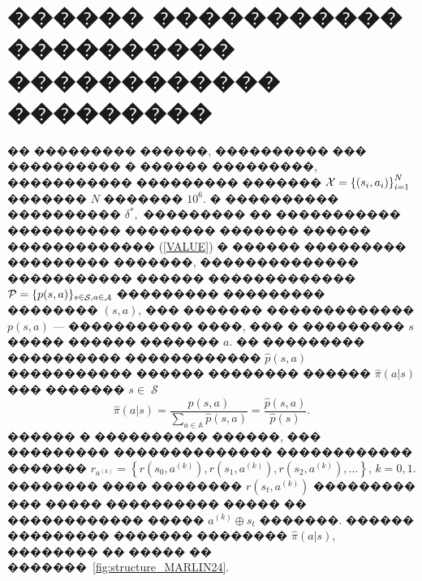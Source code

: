 \documentclass[11pt]{ubs}
\DeclareMathOperator{\perprob}{P}
\DeclareMathOperator{\state}{\mathcal{S}}
\DeclareMathOperator{\action}{\mathcal{A}}
\begin{document}
\newpage

\section{������ ����������� ���������� ������������ \\���������}
\label{par:MARLIN24_comp}





�� ��������� ������, ���������� ���  ���������� � ������ ���������, �����������
��������� �������  ${\cal X}=\left\{(s_i, a_i)\right\}_{i=1}^N$
������� $N$ ������� $10^6$. � ����������  ���������� $\delta^*,$ ��������� �� ����������� ���������� �������� ������� ������ ������������� (\ref{VALUE}) � ������ ��������� ��������� �������,  ��������������  ����������� ������
������������� ${\cal P}=\{p(s, a)\}_{s\in{\state}, a\in{\action}}$ ��������� ��������� �������� $(s, a)$, ��� ������� �������������
$p(s, a)$  --- ����������� ����, ��� � ��������� $s$ ����� ������ ������� $a$.
�� ���������
���������� ������������  $\hat{p}(s, a)$ ����������� ������
�������� ������ $\hat{\pi}(a| s)$  ��� ������� $s\in\state$
$$
  \hat{\pi}(a| s)=\frac{\hat{p}(s, a)}{\displaystyle \sum\limits_{a\in{\mathbb A}}\hat{p}(s,a)}=\frac{\hat{p}(s, a)}{\hat{p}(s)}.
$$
������ � ���������� ������, ��� ��������� �������������� ������������ �������  $r_{a^{(k)}} =\left\{r(s_0,a^{(k)}),r(s_1,a^{(k)}),r(s_2,a^{(k)}),\dots\right\}$, $ k=0,1$.
�������� ���� �������� $r\left(s_t,a^{(k)}\right)$  ��������� ��� ����� ���������� ����� �� ������������  �����  $a^{(k)}\oplus s_t$  �������. %
������ ��������� ������� �������� $\hat{\pi}(a| s),$ �������� �� ����� �� �������~\ref{fig:structure_MARLIN24}.
\end{document}
